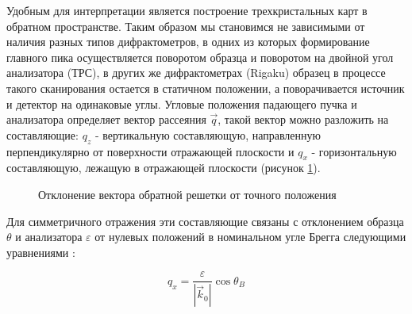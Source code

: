 Удобным для интерпретации является построение трехкристальных карт в обратном пространстве.  Таким
образом мы становимся не зависимыми от наличия разных типов дифрактометров, в одних из которых
формирование главного пика осуществляется поворотом образца и поворотом на двойной угол анализатора (ТРС),
в других же дифрактометрах (Rigaku) образец в процессе такого сканирования остается в статичном положении,
а поворачивается источник и детектор на одинаковые углы. Угловые положения падающего пучка и анализатора
определяет вектор рассеяния $\vec{q}$, такой вектор можно разложить на составляющие: $q_z$ - вертикальную составляющую,
направленную перпендикулярно от поверхности отражающей плоскости и $q_x$ - горизонтальную составляющую,
лежащую в отражающей плоскости (рисунок \ref{ris:q_vector_reciprocal_space}).

\begin{figure}[H]
  \centering
  \hfill
  \hfill
  \caption{Отклонение вектора обратной решетки от точного положения}
  \label{ris:q_vector_reciprocal_space}
\end{figure}

Для симметричного отражения эти составляющие связаны с отклонением образца $\theta$ и
анализатора $\varepsilon$ от нулевых положений в номинальном угле Брегга следующими
уравнениями \cite{Tanner_1998}:

\begin{equation}
  q_x = \frac{\varepsilon}{|\vec{k}_0|} \cos \theta_B
  \label{eq:qx_eqn}
\end{equation}

